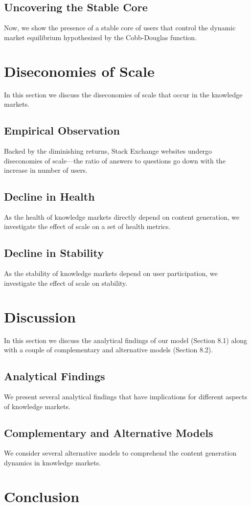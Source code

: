 \subsection{Uncovering the Stable Core} 
Now, we show the presence of a stable core of users that control the dynamic market equilibrium hypothesized by the Cobb-Douglas function.

\section{Diseconomies of Scale}
In this section we discuss the diseconomies of scale that occur in the knowledge markets.
\subsection{Empirical Observation}
Backed by the diminishing returns, Stack Exchange websites undergo diseconomies of scale---the ratio of answers to questions go down with the increase in number of users.
\subsection{Decline in Health} 
As the health of knowledge markets directly depend on content generation, we investigate the effect of scale on a set of health metrics.
\subsection{Decline in Stability} 
As the stability of knowledge markets depend on user participation, we investigate the effect of scale on stability.

\section{Discussion}
In this section we discuss the analytical findings of our model (Section 8.1) along with a couple of complementary and alternative models (Section 8.2).
\subsection{Analytical Findings}
We present several analytical findings that have implications for different aspects of knowledge markets.
\subsection{Complementary and Alternative Models}
We consider several alternative models to comprehend the content generation dynamics in knowledge markets. 

\section{Conclusion}



